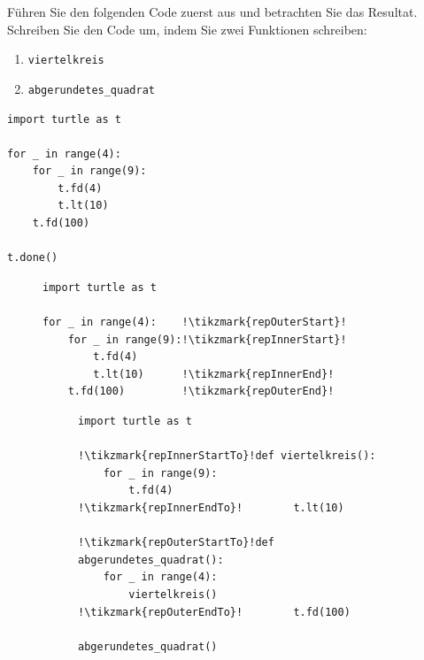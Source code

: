 \begin{myexercise}
	Führen Sie den folgenden Code zuerst aus und betrachten Sie das Resultat. Schreiben Sie den Code um, indem Sie zwei Funktionen schreiben:

	\begin{enumerate}
		\item \lstinline|viertelkreis|
		\item \lstinline|abgerundetes_quadrat|
	\end{enumerate}

	\begin{lstlisting}
import turtle as t

for _ in range(4):
    for _ in range(9):
        t.fd(4)
        t.lt(10)
    t.fd(100)

t.done()
\end{lstlisting}

	\begin{myanswer}
		\begin{figure}[H]
			\centering
			\begin{minipage}{.4\textwidth}
				\begin{lstlisting}[escapechar=!]
import turtle as t

for _ in range(4):    !\tikzmark{repOuterStart}!
    for _ in range(9):!\tikzmark{repInnerStart}!
        t.fd(4)
        t.lt(10)      !\tikzmark{repInnerEnd}!
    t.fd(100)         !\tikzmark{repOuterEnd}!
\end{lstlisting}
			\end{minipage}\hfill\begin{minipage}{.4\textwidth}
				\begin{figure}[H] %
					\begin{lstlisting}[escapechar=!]
import turtle as t

!\tikzmark{repInnerStartTo}!def viertelkreis():
    for _ in range(9):
        t.fd(4)
!\tikzmark{repInnerEndTo}!        t.lt(10)

!\tikzmark{repOuterStartTo}!def abgerundetes_quadrat():
    for _ in range(4):
        viertelkreis()
!\tikzmark{repOuterEndTo}!        t.fd(100)

abgerundetes_quadrat()


\end{lstlisting}
\end{figure}
\end{minipage}
\end{figure}
\end{myanswer}
\end{myexercise}
